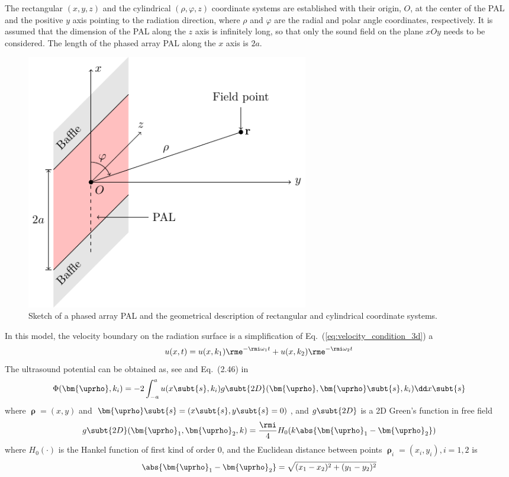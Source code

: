 The rectangular $(x, y, z)$ and the cylindrical $(\rho, \varphi, z)$ coordinate systems are established with their origin, $O$, at the center of the PAL and the positive $y$ axis pointing to the radiation direction, where $\rho$ and $\varphi$ are the radial and polar angle coordinates, respectively. 
It is assumed that the dimension of the PAL along the $z$ axis is infinitely long, so that only the sound field on the plane $xOy$ needs to be considered. 
The length of the phased array PAL along the $x$ axis is $2a$.

\begin{figure}[h]
    \centering
    \includegraphics[width = 0.6\textwidth]{Figures/pal2d_model_210817.pdf}
    \caption{Sketch of a phased array PAL and the geometrical description of rectangular and cylindrical coordinate systems.}
    \label{fig:pal2d:model}
\end{figure}

In this model, the velocity boundary on the radiation surface is a simplification of Eq.~(\ref{eq:velocity_condition_3d}) a 
\begin{equation}
    u(x, t)
    =
    u(x, k_1) \rme^{-\rmi \omega_1 t}
    +
    u(x,k_2) \rme^{-\rmi \omega_2 t}
    \label{eq:velocity_condition_2d}
\end{equation}
The ultrasound potential can be obtained as, see \cite{Poletti2019CylindricalExpansionsSound} and Eq.~(2.46) in \cite{SchmerrJr2014FundamentalsUltrasonicPhased}
\begin{equation}
    \Phi(\bm{\uprho}, k_i) = 
    - 2 \int_{-a}^a 
    u(x\subt{s},k_i)
    g\subt{2D}(\bm{\uprho},\bm{\uprho}\subt{s},k_i)
    \dd x\subt{s}
    \label{eq:potential_2d}
\end{equation}
where $\bm{\uprho} = (x,y)$ and $\bm{\uprho}\subt{s} =(x\subt{s},y\subt{s}=0)$, and $g\subt{2D}$ is a 2D Green's function in free field
\begin{equation}
    g\subt{2D}(\bm{\uprho}_1,\bm{\uprho}_2, k) 
    =
    \frac{\rmi }{4}H_0(k\abs{\bm{\uprho}_1-\bm{\uprho}_2})
    \label{eq:green_2d_328}
\end{equation}
where $H_0(\cdot)$ is the Hankel function of first kind of order 0, and the Euclidean distance between points $\bm{\uprho}_i=(x_i,y_i), i=1,2$ is 
\begin{equation}
    \abs{\bm{\uprho}_1-\bm{\uprho}_2} = 
    \sqrt{(x_1-x_2)^2 + (y_1-y_2)^2}
\end{equation}

